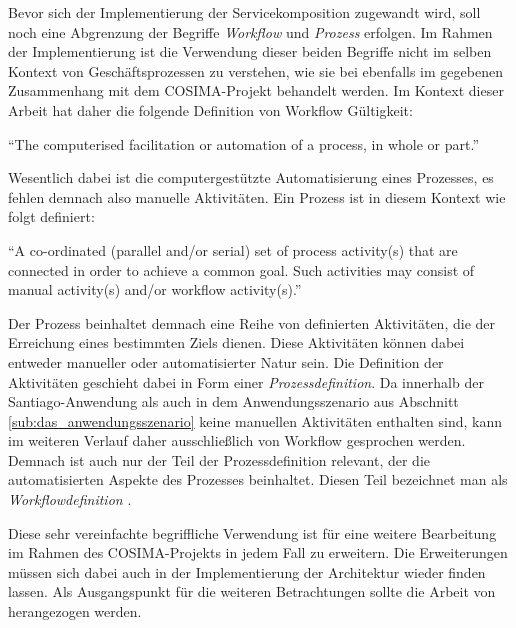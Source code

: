   \begin{kasten}
    \label{msec:der_begriff_workflow}

      Bevor sich der Implementierung der Servicekomposition zugewandt wird, soll noch eine Abgrenzung der Begriffe \emph{Workflow} und \emph{Prozess} erfolgen. Im Rahmen der Implementierung ist die Verwendung dieser beiden Begriffe nicht im selben Kontext von Geschäftsprozessen zu verstehen, wie sie bei \citep{samma08} ebenfalls im gegebenen Zusammenhang mit dem COSIMA-Projekt behandelt werden. Im Kontext dieser Arbeit hat daher die folgende Definition von Workflow Gültigkeit:
      
      \begin{definition}[Workflow]\label{def:workflow}
        "`The computerised facilitation or automation of a process, in whole or part."' \emph{\citep[S. 54]{hollingsworth1995wmc}}
      \end{definition}
      
      Wesentlich dabei ist die computergestützte Automatisierung eines Prozesses, es fehlen demnach also manuelle Aktivitäten. Ein Prozess ist in diesem Kontext wie folgt definiert:
      
      \begin{definition}[Prozess]\label{def:prozess}
        "`A co-ordinated (parallel and/or serial) set of process activity(s) that are connected in order to achieve a common goal. Such activities may consist of manual activity(s) and/or workflow activity(s)."' \emph{\citep[S. 52]{hollingsworth1995wmc}}
      \end{definition}
      
      Der Prozess beinhaltet demnach eine Reihe von definierten Aktivitäten, die der Erreichung eines bestimmten Ziels dienen. Diese Aktivitäten können dabei entweder manueller oder automatisierter Natur sein. Die Definition der Aktivitäten geschieht dabei in Form einer \emph{Prozessdefinition}. Da innerhalb der Santiago-Anwendung als auch in dem Anwendungsszenario aus Abschnitt \ref{sub:das_anwendungsszenario} keine manuellen Aktivitäten enthalten sind, kann im weiteren Verlauf daher ausschließlich von Workflow gesprochen werden. Demnach ist auch nur der Teil der Prozessdefinition relevant, der die automatisierten Aspekte des Prozesses beinhaltet. Diesen Teil bezeichnet man als \emph{Workflowdefinition} \citep[S. 52]{hollingsworth1995wmc}.
      
      Diese sehr vereinfachte begriffliche Verwendung ist für eine weitere Bearbeitung im Rahmen des COSIMA-Projekts in jedem Fall zu erweitern. Die Erweiterungen müssen sich dabei auch in der Implementierung der Architektur wieder finden lassen. Als Ausgangspunkt für die weiteren Betrachtungen sollte die Arbeit von \citep{samma08} herangezogen werden.
      
  \end{kasten}

